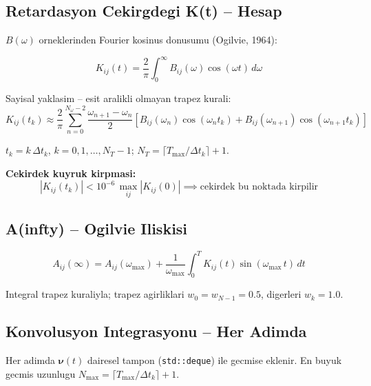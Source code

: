 \documentclass[12pt,a4paper]{article}
\newcommand{\nuvec}{\boldsymbol{\nu}}
\begin{document}
\subsection{Retardasyon Cekirgdegi K(t) -- Hesap}

$B(\omega)$ orneklerinden Fourier kosinus donusumu (Ogilvie, 1964):

\begin{equation}
  \boxed{
  K_{ij}(t) = \frac{2}{\pi} \int_0^\infty B_{ij}(\omega)\cos(\omega t)\,d\omega
  }
  \label{eq:kernel}
\end{equation}

Sayisal yaklasim -- esit aralikli olmayan trapez kurali:
\begin{equation}
  K_{ij}(t_k) \approx \frac{2}{\pi} \sum_{n=0}^{N_\omega - 2}
  \frac{\omega_{n+1}-\omega_n}{2}
  \left[B_{ij}(\omega_n)\cos(\omega_n t_k)
       + B_{ij}(\omega_{n+1})\cos(\omega_{n+1} t_k)\right]
  \label{eq:kernel_trapz}
\end{equation}

$t_k = k\,\Delta t_k$, $k=0,1,\ldots,N_T-1$;
$N_T = \lceil T_{\max}/\Delta t_k \rceil + 1$.

\textbf{Cekirdek kuyruk kirpmasi:}
\begin{equation}
  |K_{ij}(t_k)| < 10^{-6}\,\max_{ij}|K_{ij}(0)|
  \implies \text{cekirdek bu noktada kirpilir}
  \label{eq:kernel_truncation}
\end{equation}

\subsection{A(infty) -- Ogilvie Iliskisi}

\begin{equation}
  \boxed{
  A_{ij}(\infty)
    = A_{ij}(\omega_{\max})
    + \frac{1}{\omega_{\max}}
      \int_0^{T} K_{ij}(t)\sin(\omega_{\max}\,t)\,dt
  }
  \label{eq:a_inf}
\end{equation}

Integral trapez kuraliyla; trapez agirliklari $w_0 = w_{N-1} = 0.5$, digerleri $w_k = 1.0$.

\subsection{Konvolusyon Integrasyonu -- Her Adimda}

Her adimda $\nuvec(t)$ dairesel tampon (\texttt{std::deque}) ile gecmise eklenir.
En buyuk gecmis uzunlugu $N_{\max} = \lceil T_{\max}/\Delta t_k\rceil + 1$.
\end{document}
